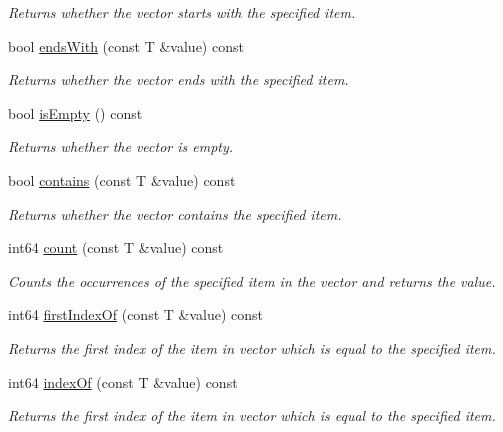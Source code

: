 \begin{DoxyCompactItemize}
\begin{DoxyCompactList}\small\item\em Returns whether the vector starts with the specified item. \end{DoxyCompactList}\item 
bool \mbox{\hyperlink{class_a_vector_a9cae5f201ad8fb74850f1d1dc2d044cc}{ends\+With}} (const T \&value) const
\begin{DoxyCompactList}\small\item\em Returns whether the vector ends with the specified item. \end{DoxyCompactList}\item 
\mbox{\label{class_a_vector_a66aa4c45a9c4126a0e97d225add9047a}} 
bool \mbox{\hyperlink{class_a_vector_a66aa4c45a9c4126a0e97d225add9047a}{is\+Empty}} () const
\begin{DoxyCompactList}\small\item\em Returns whether the vector is empty. \end{DoxyCompactList}\item 
bool \mbox{\hyperlink{class_a_vector_ab49821902c6048beab9de0e355baa386}{contains}} (const T \&value) const
\begin{DoxyCompactList}\small\item\em Returns whether the vector contains the specified item. \end{DoxyCompactList}\item 
int64 \mbox{\hyperlink{class_a_vector_a4a5f14de563e7882f8c856d308f95a96}{count}} (const T \&value) const
\begin{DoxyCompactList}\small\item\em Counts the occurrences of the specified item in the vector and returns the value. \end{DoxyCompactList}\item 
int64 \mbox{\hyperlink{class_a_vector_a708d011b518ee295e0c940ee5081871a}{first\+Index\+Of}} (const T \&value) const
\begin{DoxyCompactList}\small\item\em Returns the first index of the item in vector which is equal to the specified item. \end{DoxyCompactList}\item 
int64 \mbox{\hyperlink{class_a_vector_ab58a7db547c5381ed4b8d25163c1a576}{index\+Of}} (const T \&value) const
\begin{DoxyCompactList}\small\item\em Returns the first index of the item in vector which is equal to the specified item. \end{DoxyCompactList}\item 

\end{DoxyCompactItemize}
